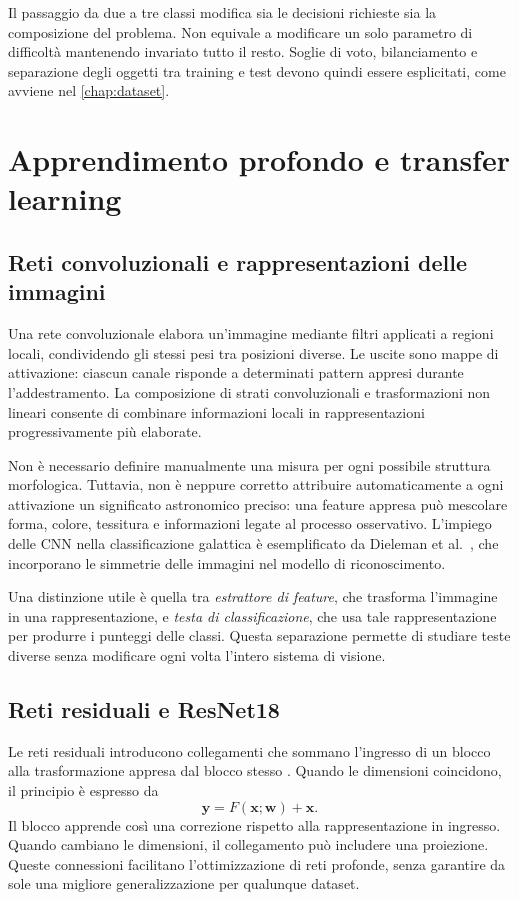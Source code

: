 Il passaggio da due a tre classi modifica sia le decisioni richieste sia
la composizione del problema. Non equivale a modificare un solo parametro
di difficoltà mantenendo invariato tutto il resto. Soglie di voto,
bilanciamento e separazione degli oggetti tra training e test devono
quindi essere esplicitati, come avviene nel \cref{chap:dataset}.

\section{Apprendimento profondo e transfer learning}
\label{sec:fond-transfer}

\subsection{Reti convoluzionali e rappresentazioni delle immagini}

Una rete convoluzionale elabora un'immagine mediante filtri applicati a
regioni locali, condividendo gli stessi pesi tra posizioni diverse.
Le uscite sono mappe di attivazione: ciascun canale risponde a determinati
pattern appresi durante l'addestramento. La composizione di strati
convoluzionali e trasformazioni non lineari consente di combinare
informazioni locali in rappresentazioni progressivamente più elaborate.

Non è necessario definire manualmente una misura per ogni possibile
struttura morfologica. Tuttavia, non è neppure corretto attribuire
automaticamente a ogni attivazione un significato astronomico preciso:
una feature appresa può mescolare forma, colore, tessitura e informazioni
legate al processo osservativo. L'impiego delle CNN nella classificazione
galattica è esemplificato da Dieleman et al.~\cite{dieleman2015galaxy},
che incorporano le simmetrie delle immagini nel modello di riconoscimento.

Una distinzione utile è quella tra \emph{estrattore di feature}, che
trasforma l'immagine in una rappresentazione, e \emph{testa di
classificazione}, che usa tale rappresentazione per produrre i punteggi
delle classi. Questa separazione permette di studiare teste diverse
senza modificare ogni volta l'intero sistema di visione.

\subsection{Reti residuali e ResNet18}

Le reti residuali introducono collegamenti che sommano l'ingresso di
un blocco alla trasformazione appresa dal blocco stesso
\cite{he2016resnet}. Quando le dimensioni coincidono, il principio è
espresso da
\begin{equation}
 \boldsymbol y=F(\boldsymbol x;\boldsymbol w)+\boldsymbol x.
\end{equation}
Il blocco apprende così una correzione rispetto alla rappresentazione
in ingresso. Quando cambiano le dimensioni, il collegamento può includere
una proiezione. Queste connessioni facilitano l'ottimizzazione di reti
profonde, senza garantire da sole una migliore generalizzazione per
qualunque dataset.

